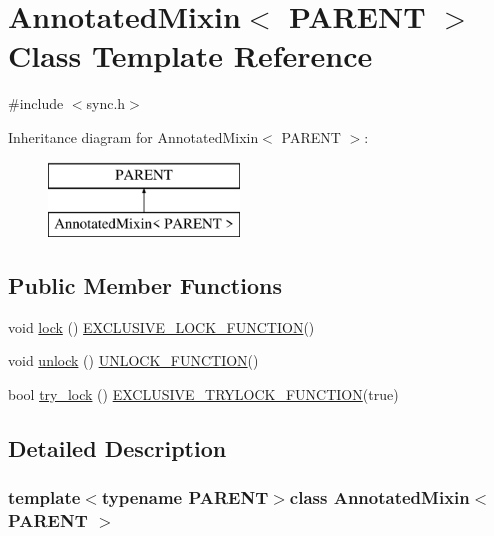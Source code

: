 \hypertarget{class_annotated_mixin}{}\section{Annotated\+Mixin$<$ P\+A\+R\+E\+N\+T $>$ Class Template Reference}
\label{class_annotated_mixin}


{\ttfamily \#include $<$sync.\+h$>$}

Inheritance diagram for Annotated\+Mixin$<$ P\+A\+R\+E\+N\+T $>$\+:\begin{figure}[H]
\begin{center}
\leavevmode
\includegraphics[height=2.000000cm]{class_annotated_mixin}
\end{center}
\end{figure}
\subsection*{Public Member Functions}
\begin{DoxyCompactItemize}
\item 
void \hyperlink{class_annotated_mixin_ad1f35c6d1b8a8e980fff45e7e7cb46d3}{lock} () \hyperlink{threadsafety_8h_a77729163b7f6867da40ad5daa5f926f3}{E\+X\+C\+L\+U\+S\+I\+V\+E\+\_\+\+L\+O\+C\+K\+\_\+\+F\+U\+N\+C\+T\+I\+O\+N}()
\item 
void \hyperlink{class_annotated_mixin_acc2e3da37c2d9dd483b859572e32bc24}{unlock} () \hyperlink{threadsafety_8h_abd56e19f9b4781b1a5212a46951cf5c3}{U\+N\+L\+O\+C\+K\+\_\+\+F\+U\+N\+C\+T\+I\+O\+N}()
\item 
bool \hyperlink{class_annotated_mixin_a9a33deab2da56790d8b5d30b1fd8350d}{try\+\_\+lock} () \hyperlink{threadsafety_8h_a3c67d370ed1f55064d85e01076aad534}{E\+X\+C\+L\+U\+S\+I\+V\+E\+\_\+\+T\+R\+Y\+L\+O\+C\+K\+\_\+\+F\+U\+N\+C\+T\+I\+O\+N}(true)
\end{DoxyCompactItemize}


\subsection{Detailed Description}
\subsubsection*{template$<$typename P\+A\+R\+E\+N\+T$>$class Annotated\+Mixin$<$ P\+A\+R\+E\+N\+T $>$}



